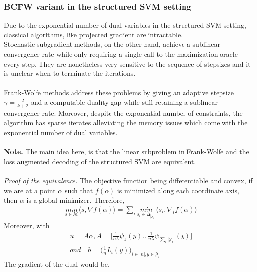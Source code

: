 \documentclass{article}
\begin{document}
\subsubsection{BCFW variant in the structured SVM setting}
Due to the exponential number of dual variables in the structured SVM setting, classical algorithms, like projected gradient are intractable.
\\
Stochastic subgradient methods, on the other hand, achieve a sublinear convergence rate while only requiring a single call to the maximization oracle every step. They are nonetheless very sensitive to the sequence of stepsizes and it is unclear when to terminate the iterations.
\\
\\
Frank-Wolfe methods address these problems by giving an  adaptive stepsize $\gamma= \frac{2}{k+2}$ and a computable duality gap while still retaining a sublinear convergence rate. Moreover, despite the exponential number of constraints, the algorithm has sparse iterates alleviating the memory issues which come with the exponential number of dual variables.\\
\\
\textbf{Note.} The main idea here, is that the linear subproblem in Frank-Wolfe and the loss augmented decoding of the structured SVM are equivalent.\\
\\
\textit{Proof of the equivalence.} The objective function being differentiable and convex, if we are at a point $\alpha$ 
such that $f(\alpha)$ is minimized along each coordinate axis, then $\alpha$ is a global minimizer. Therefore,
\begin{equation*}
\begin{aligned}
    &\underset{s\in\mathcal{M}}{\textit{min}}\langle s, \nabla f(\alpha)\rangle = \sum_{i}\underset{s_{i}\in\Delta_{|\mathcal{Y}_{i}|}}{\textit{min}}\langle s_{i}, \nabla_{i} f(\alpha)\rangle
\end{aligned}
\end{equation*}
Moreover, with 
\begin{equation*}
\begin{aligned}
   &w=A\alpha, A=\Big[\frac{1}{n\lambda}\psi_{1}(y)...\frac{1}{n\lambda}\psi_{\sum_{i}|\mathcal{Y}_{i}|}(y)\Big]\\
   &\textit{and}\quad b=\Big(\frac{1}{n}L_{i}(y)\Big)_{i\in\big[n\big],y\in\mathcal{Y}_{i}}
\end{aligned}
\end{equation*} 
The gradient of the dual would be, 
\end{document}
